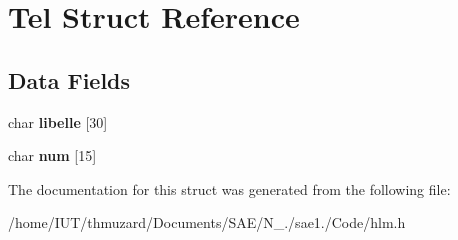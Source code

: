 \hypertarget{struct_tel}{}\section{Tel Struct Reference}
\label{struct_tel}
\subsection*{Data Fields}
\begin{DoxyCompactItemize}
\item 
\mbox{\label{struct_tel_a01e5e3ac06edf7784f94903394f5a1f2}} 
char {\bfseries libelle} \mbox{[}30\mbox{]}
\item 
\mbox{\label{struct_tel_a9e01a711cb30303f26a3e87ae68ebc02}} 
char {\bfseries num} \mbox{[}15\mbox{]}
\end{DoxyCompactItemize}


The documentation for this struct was generated from the following file\+:\begin{DoxyCompactItemize}
\item 
/home/\+I\+U\+T/thmuzard/\+Documents/\+S\+A\+E/\+N\+\_./sae1./\+Code/hlm.\+h\end{DoxyCompactItemize}

